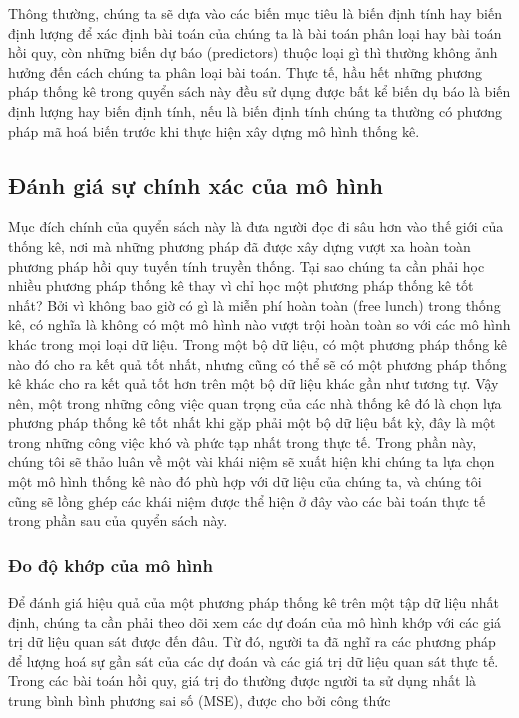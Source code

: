 \documentclass[
]{article}
\begin{document}
Thông thường, chúng ta sẽ dựa vào các biến mục tiêu là biến định tính hay biến định lượng để xác định bài toán của chúng ta là bài toán phân loại hay bài toán hồi quy, còn những biến dự báo (predictors) thuộc loại gì thì thường không ảnh hưởng đến cách chúng ta phân loại bài toán. Thực tế, hầu hết những phương pháp thống kê trong quyển sách này đều sử dụng được bất kể biến dụ báo là biến định lượng hay biến định tính, nếu là biến định tính chúng ta thường có phương pháp mã hoá biến trước khi thực hiện xây dựng mô hình thống kê.

\hypertarget{ux111uxe1nh-giuxe1-sux1ef1-chuxednh-xuxe1c-cux1ee7a-muxf4-huxecnh}{%
\subsection{Đánh giá sự chính xác của mô hình}\label{ux111uxe1nh-giuxe1-sux1ef1-chuxednh-xuxe1c-cux1ee7a-muxf4-huxecnh}}

Mục đích chính của quyển sách này là đưa người đọc đi sâu hơn vào thế giới của thống kê, nơi mà những phương pháp đã được xây dựng vượt xa hoàn toàn phương pháp hồi quy tuyến tính truyền thống. Tại sao chúng ta cần phải học nhiều phương pháp thống kê thay vì chỉ học một phương pháp thống kê tốt nhất? Bởi vì không bao giờ có gì là miễn phí hoàn toàn (free lunch) trong thống kê, có nghĩa là không có một mô hình nào vượt trội hoàn toàn so với các mô hình khác trong mọi loại dữ liệu. Trong một bộ dữ liệu, có một phương pháp thống kê nào đó cho ra kết quả tốt nhất, nhưng cũng có thể sẽ có một phương pháp thống kê khác cho ra kết quả tốt hơn trên một bộ dữ liệu khác gần như tương tự. Vậy nên, một trong những công việc quan trọng của các nhà thống kê đó là chọn lựa phương pháp thống kê tốt nhất khi gặp phải một bộ dữ liệu bất kỳ, đây là một trong những công việc khó và phức tạp nhất trong thực tế. Trong phần này, chúng tôi sẽ thảo luân về một vài khái niệm sẽ xuất hiện khi chúng ta lựa chọn một mô hình thống kê nào đó phù hợp với dữ liệu của chúng ta, và chúng tôi cũng sẽ lồng ghép các khái niệm được thể hiện ở đây vào các bài toán thực tế trong phần sau của quyển sách này.

\hypertarget{ux111o-ux111ux1ed9-khux1edbp-cux1ee7a-muxf4-huxecnh}{%
\subsubsection{Đo độ khớp của mô hình}\label{ux111o-ux111ux1ed9-khux1edbp-cux1ee7a-muxf4-huxecnh}}

Để đánh giá hiệu quả của một phương pháp thống kê trên một tập dữ liệu nhất định, chúng ta cần phải theo dõi xem các dự đoán của mô hình khớp với các giá trị dữ liệu quan sát được đến đâu. Từ đó, người ta đã nghĩ ra các phương pháp để lượng hoá sự gần sát của các dự đoán và các giá trị dữ liệu quan sát thực tế. Trong các bài toán hồi quy, giá trị đo thường được người ta sử dụng nhất là trung bình bình phương sai số (MSE), được cho bởi công thức
\end{document}

